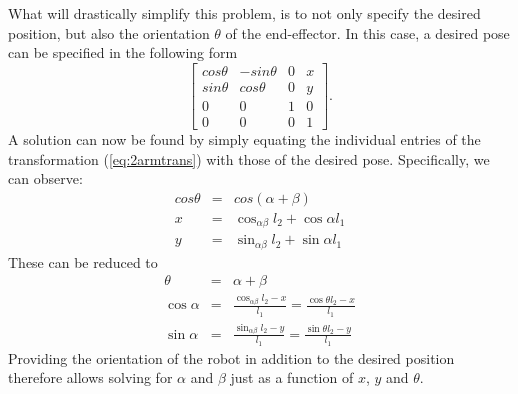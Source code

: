 What will drastically simplify this problem, is to not only specify the desired position, but also the orientation $\theta$ of the end-effector. In this case, a desired pose can be specified in the following form
\begin{equation}
\left[
\begin{array}{cccc}
cos\theta & -sin\theta & 0 & x\\
sin\theta & cos\theta & 0 & y\\
0 & 0 & 1 & 0\\
0 & 0 & 0 & 1
\end{array}
\right].
\end{equation}
A solution can now be found by simply equating the individual entries of the transformation (\ref{eq:2armtrans}) with those of the desired pose. Specifically, we can observe:
\begin{eqnarray}
cos\theta &=& cos(\alpha+\beta)\\
\nonumber
x &=& \cos_{\alpha\beta}l_2+\cos\alpha l_1\\
\nonumber
y &=& \sin_{\alpha\beta}l_2+\sin\alpha l_1
\end{eqnarray}
These can be reduced to
\begin{eqnarray}
\theta &=& \alpha + \beta \nonumber \\
\cos\alpha &=& \frac{\cos_{\alpha\beta}l_2-x}{l_1}=\frac{\cos\theta l_2-x}{l_1} \\
\sin\alpha &=& \frac{\sin_{\alpha\beta}l_2-y}{l_1}=\frac{\sin\theta l_2-y}{l_1} \nonumber
\end{eqnarray}
Providing the orientation of the robot in addition to the desired position therefore allows solving for $\alpha$ and $\beta$ just as a function of $x$, $y$ and $\theta$.

